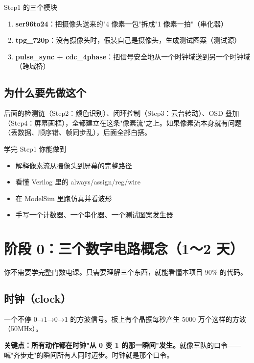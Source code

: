 \documentclass[11pt]{ctexart}
\begin{document}
\begin{keybox}{Step1 的三个模块}
\begin{enumerate}
  \item \textbf{ser96to24}：把摄像头送来的"4 像素一包"拆成"1 像素一拍"（串化器）
  \item \textbf{tpg\_720p}：没有摄像头时，假装自己是摄像头，生成测试图案（测试源）
  \item \textbf{pulse\_sync + cdc\_4phase}：把信号安全地从一个时钟域送到另一个时钟域（跨域桥）
\end{enumerate}
\end{keybox}

\subsection{为什么要先做这个}

后面的检测链（Step2：颜色识别）、闭环控制（Step3：云台转动）、OSD 叠加（Step4：屏幕画框），全都建立在这条"像素流"之上。如果像素流本身就有问题（丢数据、顺序错、帧同步乱），后面全部白搭。

\begin{okbox}{学完 Step1 你能做到}
\begin{itemize}
  \item 解释像素流从摄像头到屏幕的完整路径
  \item 看懂 Verilog 里的 always/assign/reg/wire
  \item 在 ModelSim 里跑仿真并看波形
  \item 手写一个计数器、一个串化器、一个测试图案发生器
\end{itemize}
\end{okbox}

\section{阶段 0：三个数字电路概念（1～2 天）}

你不需要学完整门数电课。只需要理解三个东西，就能看懂本项目 90\% 的代码。

\subsection{时钟（clock）}

一个不停 0→1→0→1 的方波信号。板上有个晶振每秒产生 5000 万个这样的方波（50MHz）。

\textbf{关键点：所有动作都在时钟"从 0 变 1 的那一瞬间"发生。}就像军队的口令——喊"齐步走"的瞬间所有人同时迈步。时钟就是那个口令。
\end{document}

